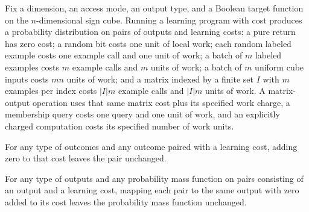 \begin{definition}
\label{FABL.LearningProgram.runWithCost}
\leanok
{}
Fix a dimension, an access mode, an output type, and a Boolean target function on the
$n$-dimensional sign cube. Running a learning program with cost produces a probability
distribution on pairs of outputs and learning costs: a pure return has zero cost; a
random bit costs one unit of local work; each random labeled example costs one example
call and one unit of work; a batch of $m$ labeled examples costs $m$ example calls and
$m$ units of work; a batch of $m$ uniform cube inputs costs $mn$ units of work; and a
matrix indexed by a finite set $I$ with $m$ examples per index costs $|I|m$ example
calls and $|I|m$ units of work. A matrix-output operation uses that same matrix cost
plus its specified work charge, a membership query costs one query and one unit of work,
and an explicitly charged computation costs its specified number of work units.
\end{definition}

\begin{theorem}
\label{FABL.LearningProgram.addOutcomeCost_zero}
\leanok
{}
For any type of outcomes and any outcome paired with a learning cost, adding zero to
that cost leaves the pair unchanged.
\end{theorem}

\begin{theorem}
\label{FABL.LearningProgram.map_addOutcomeCost_zero}
\leanok
{}
For any type of outputs and any probability mass function on pairs consisting of an
output and a learning cost, mapping each pair to the same output with zero added to its
cost leaves the probability mass function unchanged.
\end{theorem}

